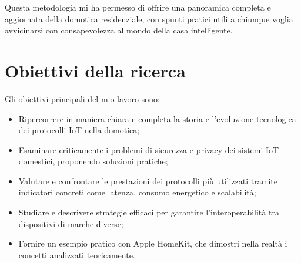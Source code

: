 Questa metodologia mi ha permesso di offrire una panoramica completa e aggiornata della domotica residenziale, con spunti pratici utili a chiunque voglia avvicinarsi con consapevolezza al mondo della casa intelligente.

\section{Obiettivi della ricerca}
Gli obiettivi principali del mio lavoro sono:
\begin{itemize}
\item Ripercorrere in maniera chiara e completa la storia e l’evoluzione tecnologica dei protocolli IoT nella domotica;
\item Esaminare criticamente i problemi di sicurezza e privacy dei sistemi IoT domestici, proponendo soluzioni pratiche;
\item Valutare e confrontare le prestazioni dei protocolli più utilizzati tramite indicatori concreti come latenza, consumo energetico e scalabilità;
\item Studiare e descrivere strategie efficaci per garantire l'interoperabilità tra dispositivi di marche diverse;
\item Fornire un esempio pratico con Apple HomeKit, che dimostri nella realtà i concetti analizzati teoricamente.
\end{itemize}
